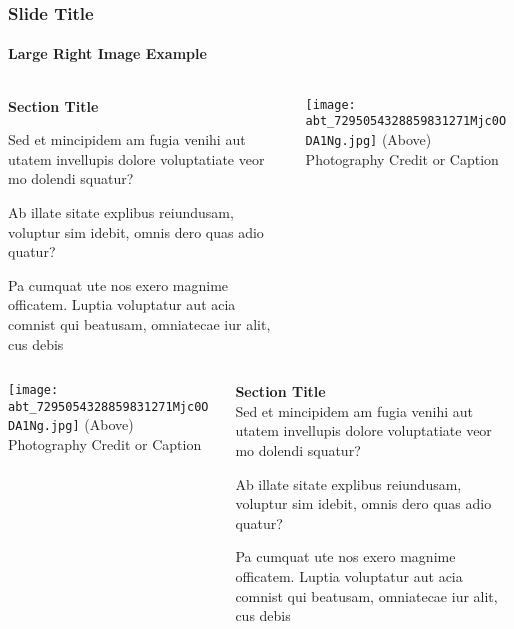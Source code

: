 \documentclass[
	aspectratio=169, %
	t, %
	onlytextwidth, %
	10pt, %
]{beamer}
\begin{document}
\begin{frame}
	\frametitle{Slide Title}
	\framesubtitle{Large Right Image Example}
	
	\begin{columns}[T] %
		\begin{column}{0.48\linewidth} %
			\textbf{Section Title}
		
			Sed et mincipidem am fugia venihi aut utatem invellupis dolore voluptatiate veor mo dolendi squatur?

			Ab illate sitate explibus reiundusam, voluptur sim idebit, omnis dero quas adio quatur?

			Pa cumquat ute nos exero magnime officatem. Luptia voluptatur aut acia comnist qui beatusam, omniatecae iur alit, cus debis
		\end{column}
		\begin{column}{0.48\linewidth} %
			\vspace{-3.5\baselineskip} %
			
			\texttt{[image: abt\_7295054328859831271Mjc0ODA1Ng.jpg]} %
			{\tiny\textcolor{ICLBlue}{(Above) Photography Credit or Caption}}
		\end{column}
	\end{columns}
\end{frame}


\begin{frame}
	\begin{columns}[T] %
		\begin{column}{0.48\linewidth} %
			\texttt{[image: abt\_7295054328859831271Mjc0ODA1Ng.jpg]} %
			{\tiny\textcolor{ICLBlue}{(Above) Photography Credit or Caption}}
		\end{column}
		\begin{column}{0.48\linewidth} %
			\textbf{Section Title}\\
			Sed et mincipidem am fugia venihi aut utatem invellupis dolore voluptatiate veor mo dolendi squatur?

			Ab illate sitate explibus reiundusam, voluptur sim idebit, omnis dero quas adio quatur?

			Pa cumquat ute nos exero magnime officatem. Luptia voluptatur aut acia comnist qui beatusam, omniatecae iur alit, cus debis
		\end{column}
	\end{columns}
\end{frame}
\end{document}
